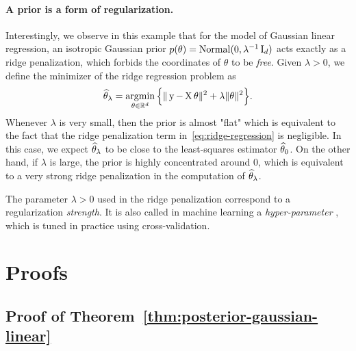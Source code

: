 \paragraph{A prior is a form of regularization.}

Interestingly, we observe in this example that for the model of Gaussian linear regression, an isotropic Gaussian prior $p(\theta) = \operatorname{Normal}(0, \lambda^{-1} \operatorname{{\boldsymbol I}}_d)$ acts exactly as a ridge penalization, which forbids the coordinates of $\theta$ to be \emph{free}.%
Given $\lambda > 0$, we define the minimizer of the ridge regression problem as
\begin{equation}
	\label{eq:ridge-regression}
	\widehat \theta_\lambda = \operatorname*{argmin}_{\theta \in \mathbb R^d} \Big\{ \| \operatorname{{\boldsymbol y}} - \operatorname{{\boldsymbol X}} \theta \|^2 + \lambda \| \theta \|^2 \Big\}.
\end{equation}
Whenever $\lambda$ is very small, then the prior is almost "flat" which is equivalent to the fact that the ridge penalization term in~\eqref{eq:ridge-regression} is negligible.
In this case, we expect $\widehat \theta_\lambda$ to be close to the least-squares estimator $\widehat \theta_0$.%
On the other hand, if $\lambda$ is large, the prior is highly concentrated around $0$, which is equivalent to a very strong ridge penalization in the computation of $\widehat \theta_\lambda$.

The parameter $\lambda > 0$ used in the ridge penalization correspond to a regularization \emph{strength}.
It is also called in machine learning a \emph{hyper-parameter}%
, which is tuned in practice using cross-validation.


\section{Proofs} %
\label{sec:sec:chap05_proofs}


\subsection{Proof of Theorem~\ref{thm:posterior-gaussian-linear}} %
\label{sub:proof_of_theorem_thm:posterior-gaussian-linear}

